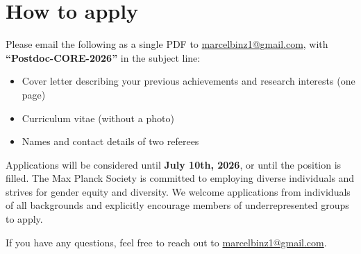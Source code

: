 \section*{How to apply}
\begin{callout}
Please email the following as a single PDF to
\href{mailto:marcelbinz1@gmail.com}{marcelbinz1@gmail.com},
with \textbf{“Postdoc-CORE-2026”} in the subject line:
\begin{itemize}
  \item Cover letter describing your previous achievements and research interests (one page)
  \item Curriculum vitae (without a photo)
  \item Names and contact details of two referees
\end{itemize}

\vspace{5pt}
Applications will be considered until \textbf{July 10th, 2026}, or until the
position is filled. The Max Planck Society is committed to employing diverse
individuals and strives for gender equity and diversity. We welcome applications
from individuals of all backgrounds and explicitly encourage members of
underrepresented groups to apply.

\vspace{5pt}
{\color{inksoft}If you have any questions, feel free to reach out to
\href{mailto:marcelbinz1@gmail.com}{marcelbinz1@gmail.com}.}
\end{callout}


